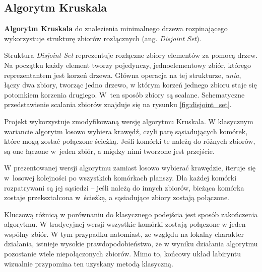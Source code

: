 \subsection{Algorytm Kruskala}

\textbf{Algorytm Kruskala} \cite{cormen2009} do znalezienia minimalnego drzewa rozpinającego wykorzystuje strukturę zbiorów rozłącznych (ang. \textit{Disjoint Set}).

Struktura \textit{Disjoint Set} reprezentuje rozłączne zbiory elementów za pomocą drzew. Na początku każdy element tworzy pojedynczy, jednoelementowy zbiór, którego reprezentantem jest korzeń drzewa. Główna operacja na tej strukturze, \textit{unia}, łączy dwa zbiory, tworząc jedno drzewo, w którym korzeń jednego zbioru staje się potomkiem korzenia drugiego. W~ten sposób zbiory są scalane. Schematyczne przedstawienie scalania zbiorów znajduje się na rysunku \ref{fig:disjoint_set}.



Projekt wykorzystuje zmodyfikowaną wersję algorytmu Kruskala. W klasycznym wariancie algorytm losowo wybiera krawędź, czyli parę sąsiadujących komórek, które mogą zostać połączone ścieżką. Jeśli komórki te należą do różnych zbiorów, są one łączone w~jeden zbiór, a między nimi tworzone jest przejście.

W prezentowanej wersji algorytmu zamiast losowo wybierać krawędzie, iteruje się w~losowej kolejności po wszystkich komórkach planszy. Dla każdej komórki rozpatrywani są jej sąsiedzi – jeśli należą do innych zbiorów, bieżąca komórka zostaje przekształcona w~ścieżkę, a sąsiadujące zbiory zostają połączone.

Kluczową różnicą w porównaniu do klasycznego podejścia jest sposób zakończenia algorytmu. W tradycyjnej wersji wszystkie komórki zostają połączone w jeden wspólny zbiór. W tym przypadku natomiast, ze względu na lokalny charakter działania, istnieje wysokie prawdopodobieństwo, że w wyniku działania algorytmu pozostanie wiele niepołączonych zbiorów. Mimo to, końcowy układ labiryntu wizualnie przypomina ten uzyskany metodą klasyczną.

